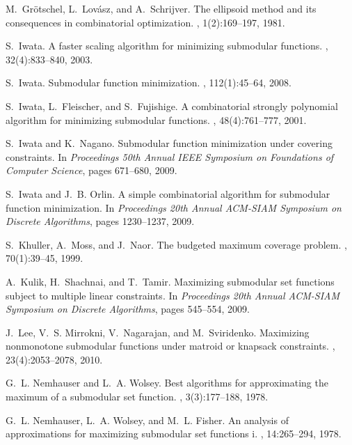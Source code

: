 \documentclass[11pt]{article}
\theoremstyle{plain}
\theoremstyle{definition}
\begin{document}
\begin{thebibliography}{10}
M.~Gr{\"o}tschel, L.~Lov{\'a}sz, and A.~Schrijver.
\newblock The ellipsoid method and its consequences in combinatorial
  optimization.
, 1(2):169--197, 1981.

S.~Iwata.
\newblock A faster scaling algorithm for minimizing submodular functions.
, 32(4):833--840, 2003.

S.~Iwata.
\newblock Submodular function minimization.
, 112(1):45--64, 2008.

S.~Iwata, L.~Fleischer, and S.~Fujishige.
\newblock A combinatorial strongly polynomial algorithm for minimizing
  submodular functions.
, 48(4):761--777, 2001.

S.~Iwata and K.~Nagano.
\newblock Submodular function minimization under covering constraints.
\newblock In {\em Proceedings 50th Annual IEEE Symposium on Foundations of
  Computer Science}, pages 671--680, 2009.

S.~Iwata and J.~B. Orlin.
\newblock A simple combinatorial algorithm for submodular function
  minimization.
\newblock In {\em Proceedings 20th Annual ACM-SIAM Symposium on Discrete
  Algorithms}, pages 1230--1237, 2009.

S.~Khuller, A.~Moss, and J.~Naor.
\newblock The budgeted maximum coverage problem.
, 70(1):39--45, 1999.

A.~Kulik, H.~Shachnai, and T.~Tamir.
\newblock Maximizing submodular set functions subject to multiple linear
  constraints.
\newblock In {\em Proceedings 20th Annual ACM-SIAM Symposium on Discrete
  Algorithms}, pages 545--554, 2009.

J.~Lee, V.~S. Mirrokni, V.~Nagarajan, and M.~Sviridenko.
\newblock Maximizing nonmonotone submodular functions under matroid or knapsack
  constraints.
, 23(4):2053--2078, 2010.

G.~L. Nemhauser and L.~A. Wolsey.
\newblock Best algorithms for approximating the maximum of a submodular set
  function.
, 3(3):177--188, 1978.

G.~L. Nemhauser, L.~A. Wolsey, and M.~L. Fisher.
\newblock An analysis of approximations for maximizing submodular set functions
  {\sc i}.
, 14:265--294, 1978.


\end{thebibliography}
\end{document}
